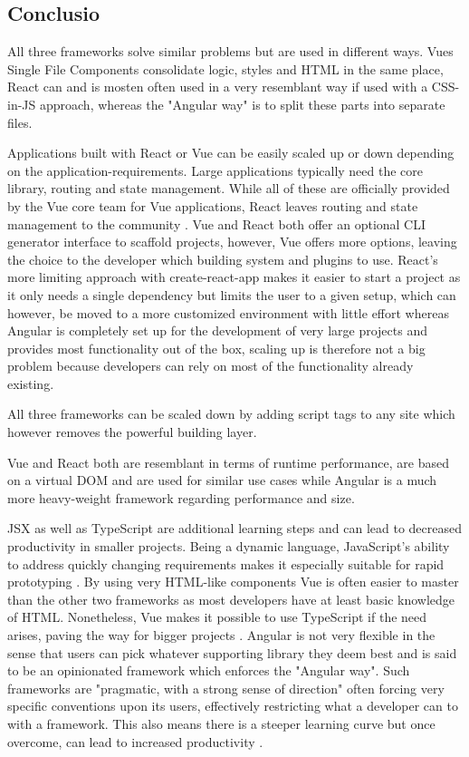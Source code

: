 \subsection{Conclusio}
All three frameworks solve similar problems but are used in different ways. Vues Single File Components consolidate logic, styles and HTML in the same place, React can and is mosten often used in a very resemblant way if used with a CSS-in-JS approach, whereas the "Angular way" is to split these parts into separate files. 

Applications built with React or Vue can be easily scaled up or down depending on the application-requirements. Large applications typically need the core library, routing and state management. While all of these are officially provided by the Vue core team for Vue applications, React leaves routing and state management to the community \cite{ComparisonVue:online}. Vue and React both offer an optional CLI generator interface to scaffold projects, however, Vue offers more options, leaving the choice to the developer which building system and plugins to use. React's more limiting approach with create-react-app makes it easier to start a project as it only needs a single dependency but limits the user to a given setup, which can however, be moved to a more customized environment with little effort whereas Angular is completely set up for the development of very large projects and provides most functionality out of the box, scaling up is therefore not a big problem because developers can rely on most of the functionality already existing.

All three frameworks can be scaled down by adding script tags to any site \cite{AddingReact:online, ComparisonVue:online} which however removes the powerful building layer.

Vue and React both are resemblant in terms of runtime performance, are based on a virtual DOM and are used for similar use cases while Angular is a much more heavy-weight framework regarding performance and size. 

JSX as well as TypeScript are additional learning steps and can lead to decreased productivity in smaller projects. Being a dynamic language, JavaScript's ability to address quickly changing requirements makes it especially suitable for rapid prototyping \cite[p.~72]{DynamicallyTypedLanguages:proceedings}. By using very HTML-like components Vue is often easier to master than the other two frameworks as most developers have at least basic knowledge of HTML. Nonetheless, Vue makes it possible to use TypeScript if the need arises, paving the way for bigger projects \cite{VueTypeScript:online}. Angular is not very flexible in the sense that users can pick whatever supporting library they deem best and is said to be an opinionated framework which enforces the "Angular way". Such frameworks are "pragmatic, with a strong sense of direction" \cite{Bedell:Opinionated:article} often forcing very specific conventions upon its users, effectively restricting what a developer can to with a framework. This also means there is a steeper learning curve but once overcome, can lead to increased productivity \cite{ComparisonVue:online}.

